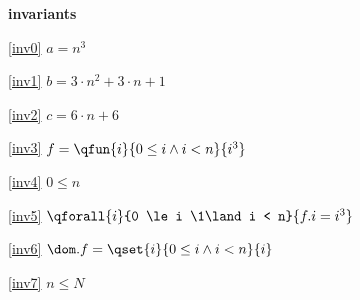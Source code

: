 \textbf{invariants}
\begin{block}
\item[ \eqref{inv0} ]{$a = n^3	$} %
\item[ \eqref{inv1} ]{$b = 3 \cdot n^2 + 3 \cdot n + 1	$} %
\item[ \eqref{inv2} ]{$c = 6 \cdot n + 6	$} %
\item[ \eqref{inv3} ]{$f = \qfun{i}{ 0 \le i \land i < n }{ i^3 } $} %
\item[ \eqref{inv4} ]{$0 \le n $} %
\item[ \eqref{inv5} ]{$\qforall{i}{0 \le i \1\land i < n}{ f.i = i^3 }		$} %
\item[ \eqref{inv6} ]{$\dom.f = \qset{i}{0 \le i \land i < n }{ i }		$} %
\item[ \eqref{inv7} ]{$n \le N %
	$} %
\end{block}
